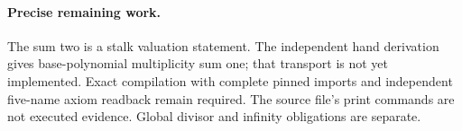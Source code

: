 \documentclass[10pt]{article}
\begin{document}
\paragraph{Precise remaining work.} The sum two is a stalk valuation statement. The independent hand derivation gives base-polynomial multiplicity sum one; that transport is not yet implemented. Exact compilation with complete pinned imports and independent five-name axiom readback remain required. The source file's print commands are not executed evidence. Global divisor and infinity obligations are separate.
\end{document}
